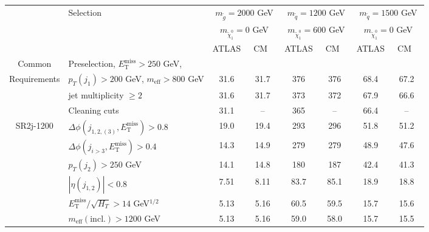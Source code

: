 \documentclass[10pt,fleqn]{article}
\newcommand{\met}{E^\mathrm{miss}_\mathrm{T}}
\newcommand{\meff}{m_\mathrm{eff}}
\begin{document}
\begin{table}[h!] 
 \renewcommand*{\arraystretch}{1.}
 \begin{tabular}{c|l|c|c|c|c|c|c} \toprule
      & Selection & \multicolumn{2}{c|}{$m_{\tilde{g}} = 2000$ GeV}      & \multicolumn{2}{c|}{$m_{\tilde{q}} = 1200$ GeV}         & \multicolumn{2}{c}{$m_{\tilde{q}} = 1500$ GeV}         \\ 
      &           & \multicolumn{2}{c|}{$m_{\tilde{\chi}^0_1} = 0$ GeV}  & \multicolumn{2}{c|}{$m_{\tilde{\chi}^0_1} = 600$ GeV}   & \multicolumn{2}{c}{$m_{\tilde{\chi}^0_1} = 0$ GeV}     \\ \midrule
      &           & ATLAS             &  ~CM~~                           & ATLAS             & ~CM~~                            & ATLAS             & ~CM~~                            \\ \midrule
Common& Preselection, $\met > 250$ GeV,&          &   &   &  & & \\ 
Requirements & $p_T(j_1) > 200$ GeV, $\meff > 800$ GeV         &     31.6   &   31.7    &  376       &   376     &      68.4    &   67.2         \\
             & jet multiplicity $\geq 2$                       &     31.6   &   31.7    &  373       &   372     &      67.9    &   66.6         \\
             & Cleaning cuts                                   &     31.1   &   --      &  365       &   --      &      66.4    &   --          \\ \midrule
SR2j-1200    & $\Delta\phi(j_{1,2,(3)},\met) > 0.8$            &     19.0   &   19.4    &  293       &   296     &      51.8    &   51.2         \\
             & $\Delta\phi(j_{i>3},\met) > 0.4$                &     14.3   &   14.9    &  279       &   279     &      48.9    &   47.6         \\
             & $p_T(j_2) > 250$ GeV                            &     14.1   &   14.8    &  180       &   187     &      42.4    &   41.3         \\      
             & $|\eta(j_{1,2})|< 0.8$                          &     7.51   &   8.11    &  83.7      &   85.1    &      18.9    &   18.8         \\                   
             & $\met/\sqrt{H_T} > 14$ GeV$^{1/2}$              &     5.13   &   5.16    &  60.5      &   59.5    &      15.7    &   15.6         \\    
             & $\meff(\mathrm{incl.}) > 1200$ GeV              &     5.13   &   5.16    &  59.0      &   58.0    &      15.7    &   15.5         \\ \midrule   

\end{tabular}
\end{table}
\end{document}
